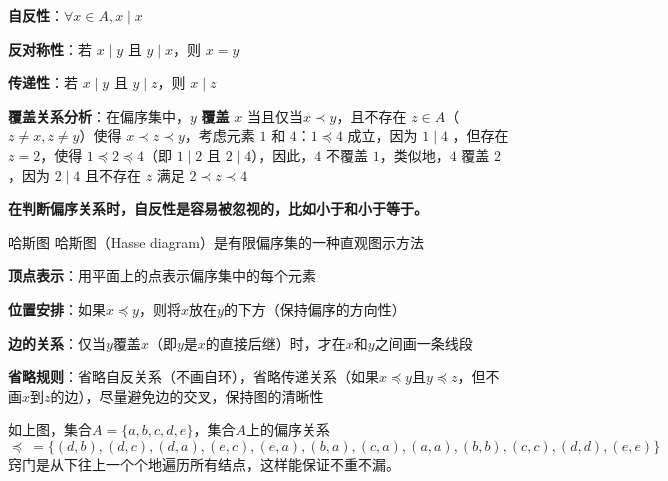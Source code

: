\documentclass[lang=cn,11pt]{elegantbook}
\begin{document}
\textbf{自反性}：$\forall x \in A, x \mid x$

\textbf{反对称性}：若 $x \mid y$ 且 $y \mid x$，则 $x = y$

\textbf{传递性}：若 $x \mid y$ 且 $y \mid z$，则 $x \mid z$

\textbf{覆盖关系分析}：在偏序集中，$y$ \textbf{覆盖} $x$ 当且仅当$x \prec y$，且不存在 $z \in A$（$z \neq x, z \neq y$）使得 $x \prec z \prec y$，考虑元素 $1$ 和 $4$：$1 \preccurlyeq 4$ 成立，因为 $1 \mid 4$
，但存在 $z = 2$，使得 $1 \preccurlyeq 2 \preccurlyeq 4$（即 $1 \mid 2$ 且 $2 \mid 4$），因此，$4$ 不覆盖 $1$，类似地，$4$ 覆盖 $2$，因为 $2 \mid 4$ 且不存在 $z$ 满足 $2 \prec z \prec 4$

\textbf{在判断偏序关系时，自反性是容易被忽视的，比如小于和小于等于。}
\begin{definition}{哈斯图}
哈斯图（Hasse diagram）是有限偏序集的一种直观图示方法

\textbf{顶点表示}：用平面上的点表示偏序集中的每个元素

\textbf{位置安排}：如果$x \preccurlyeq y$，则将$x$放在$y$的下方（保持偏序的方向性）

\textbf{边的关系}：仅当$y$覆盖$x$（即$y$是$x$的直接后继）时，才在$x$和$y$之间画一条线段

\textbf{省略规则}：省略自反关系（不画自环），省略传递关系（如果$x \preccurlyeq y$且$y \preccurlyeq z$，但不画$x$到$z$的边），尽量避免边的交叉，保持图的清晰性
\end{definition}
\begin{figure}[!ht]
\centering
{}%
\end{figure}
如上图，集合$A=\{a,b,c,d,e\}$，集合$A$上的偏序关系\[\preccurlyeq\ =\{(d,b),(d,c),(d,a),(e,c),(e,a),(b,a),(c,a),(a,a),(b,b),(c,c),(d,d),(e,e)\}\]窍门是从下往上一个个地遍历所有结点，这样能保证不重不漏。
\end{document}
